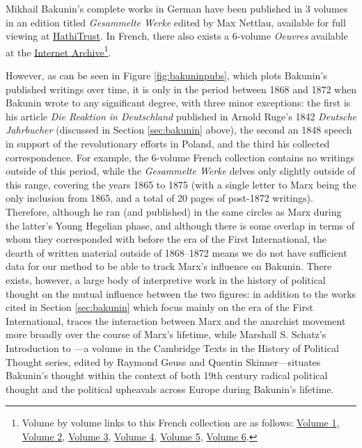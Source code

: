 Mikhail Bakunin's complete works in German have been published in 3 volumes in an edition titled \textit{Gesammelte Werke} edited by Max Nettlau, available for full viewing at \href{https://catalog.hathitrust.org/Record/012322886}{HathiTrust}.
In French, there also exists a 6-volume \textit{Oeuvres} available at the \href{https://archive.org/details/oeuvresbs01bakuuoft}{Internet Archive}\footnote{Volume by volume links to this French collection are as follows: \href{https://archive.org/details/oeuvresbs01bakuuoft}{Volume 1}, \href{https://archive.org/details/oeuvresbs02bakuuoft}{Volume 2}, \href{https://archive.org/details/oeuvresbs03bakuuoft}{Volume 3}, \href{https://archive.org/details/oeuvresbs04bakuuoft}{Volume 4}, \href{https://archive.org/details/oeuvresbs05bakuuoft}{Volume 5}, \href{https://archive.org/details/oeuvresbs06bakuuoft}{Volume 6}.}.

However, as can be seen in Figure \ref{fig:bakuninpubs}, which plots Bakunin's published writings over time, 
it is only in the period between 1868 and 1872 when Bakunin wrote to any significant degree, with three minor exceptions: the first is his article \textit{Die Reaktion in Deutschland} published in Arnold Ruge's 1842 \textit{Deutsche Jahrbucher} (discussed in Section \ref{sec:bakunin} above), the second an 1848 speech in support of the revolutionary efforts in Poland, and the third his collected correspondence. For example, the 6-volume French collection contains no writings outside of this period, while the \textit{Gesammelte Werke} delves only slightly outside of this range, covering the years 1865 to 1875 (with a single letter to Marx being the only inclusion from 1865, and a total of 20 pages of post-1872 writings). Therefore, although he ran (and published) in the same circles as Marx during the latter's Young Hegelian phase, and although there is some overlap in terms of whom they corresponded with before the era of the First International, the dearth of written material outside of 1868--1872 means we do not have sufficient data for our method to be able to track Marx's influence on Bakunin. There exists, however, a large body of interpretive work in the history of political thought on the mutual influence between the two figures: in addition to the works cited in Section \ref{sec:bakunin} which focus mainly on the era of the First International, \cite{thomas_karl_1980} traces the interaction between Marx and the anarchist movement more broadly over the course of Marx's lifetime, while Marshall S. Schatz's Introduction to \cite{bakunin_statism_1990}---a volume in the Cambridge Texts in the History of Political Thought series, edited by Raymond Geuss and Quentin Skinner---situates Bakunin's thought within the context of both 19th century radical political thought and the political upheavals across Europe during Bakunin's lifetime.

